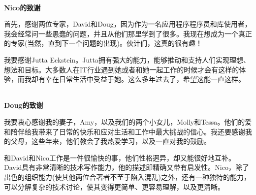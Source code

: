 \hspace*{\fill} \\ %
\noindent\textbf{Nico的致谢}

首先，感谢两位专家，David和Doug，因为作为一名应用程序程序员和库使用者，我会经常问一些愚蠢的问题，并且从他们那里学到了很多。我现在想成为一个真正的专家(当然，直到下一个问题的出现)。伙计们，这真的很有趣！

我要感谢Jutta Eckstein。Jutta拥有强大的能力，能够推动和支持人们实现理想、想法和目标。大多数人在IT行业遇到她或者和她一起工作的时候才会有这样的体验，而我却有幸在日常生活中受益于她。这么多年过去了，希望这能一直这样。

\hspace*{\fill} \\ %
\noindent\textbf{Doug的致谢}

我要衷心感谢我的妻子，Amy，以及我们的两个小女儿，Molly和Tessa。他们的爱和陪伴给我带来了日常的快乐和应对生活和工作中最大挑战的信心。我还要感谢我的父母，这些年来，他们教会了我热爱学习，以及一直对我的鼓励。

和David和Nico工作是一件很愉快的事，他们性格迥异，却又能很好地互补。David具有非常清晰的技术写作能力，他的描述即精确又带有启发性。Nico，除了出色的组织能力(使其他两位合著者不至于陷入混乱)之外，还有一种独特的能力，可以分解复杂的技术讨论，使其变得更简单、更容易理解，以及更清晰。


